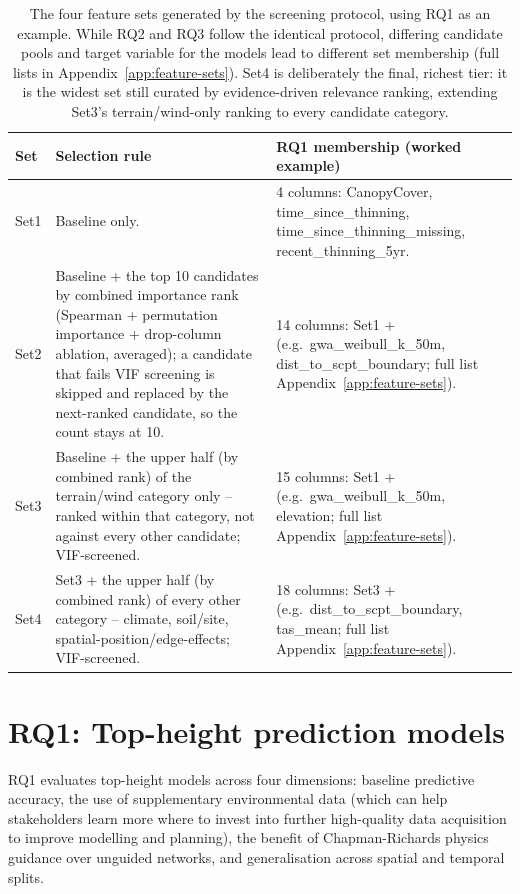 \begin{table}[!htbp]
\centering
\scriptsize
\renewcommand{\arraystretch}{1.2}
\begin{tabular}{p{1cm}p{5.3cm}p{7.2cm}}
\toprule
Set & Selection rule & RQ1 membership (worked example) \\
\midrule
Set1 & Baseline only. & 4 columns: CanopyCover, time\_since\_thinning,
time\_since\_thinning\_missing, recent\_thinning\_5yr. \\
Set2 & Baseline + the top 10 candidates by combined importance rank (Spearman + permutation
importance + drop-column ablation, averaged); a candidate that fails VIF screening is skipped and
replaced by the next-ranked candidate, so the count stays at 10. & 14 columns: Set1 + (e.g.\
gwa\_weibull\_k\_50m, dist\_to\_scpt\_boundary; full list Appendix~\ref{app:feature-sets}). \\
Set3 & Baseline + the upper half (by combined rank) of the terrain/wind category only -- ranked
within that category, not against every other candidate; VIF-screened. & 15 columns: Set1 + (e.g.\
gwa\_weibull\_k\_50m, elevation; full list Appendix~\ref{app:feature-sets}). \\
Set4 & Set3 + the upper half (by combined rank) of every other category -- climate, soil/site,
spatial-position/edge-effects; VIF-screened. & 18 columns: Set3 + (e.g.\ dist\_to\_scpt\_boundary,
tas\_mean; full list Appendix~\ref{app:feature-sets}). \\
\bottomrule
\end{tabular}
\caption{The four feature sets generated by the screening protocol, using RQ1 as an example. While RQ2 and RQ3 follow the identical protocol, differing candidate pools and target variable for the models lead to different set membership (full lists in Appendix~\ref{app:feature-sets}). Set4 is deliberately the final, richest tier: it is the widest set still curated by evidence-driven relevance ranking, extending Set3's terrain/wind-only ranking to every candidate category.}
\label{tab:feature-sets-composition-rq1}
\end{table} %

\section{RQ1: Top-height prediction models}
\label{sec:rq1-models}

RQ1 evaluates top-height models across four dimensions: baseline predictive accuracy, the use of supplementary environmental data (which can help stakeholders learn more where to invest into further high-quality data acquisition to improve modelling and planning), the benefit of Chapman-Richards physics guidance over unguided networks, and generalisation across spatial and temporal splits.

